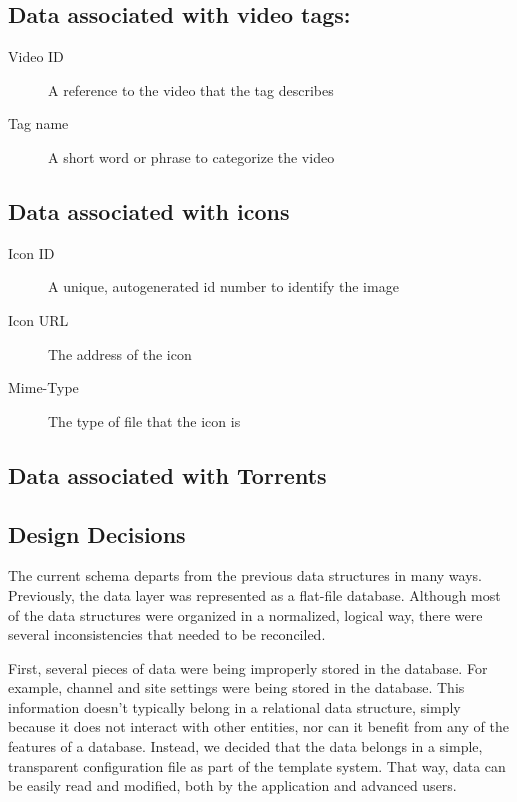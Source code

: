 \documentclass[a4paper,12pt]{report}
\begin{document}
\subsection{Data associated with video tags:}
\begin{description}
\item[Video ID] A reference to the video that the tag describes
\item[Tag name] A short word or phrase to categorize the video
\end{description}

\subsection{Data associated with icons}
\begin{description}
\item[Icon ID] A unique, autogenerated id number to identify the image
\item[Icon URL] The address of the icon
\item[Mime-Type] The type of file that the icon is
\end{description}

\subsection{Data associated with Torrents}



\subsection{Design Decisions}
The current schema departs from the previous data structures in many ways.
Previously, the data layer was represented as a flat-file database.
Although most of the data structures were organized in a normalized, logical way, there were several inconsistencies that needed to be reconciled.


First, several pieces of data were being improperly stored in the database. 
For example, channel and site settings were being stored in the database. 
This information doesn't typically belong in a relational data structure, simply because it does not interact with other entities, nor can it benefit from any of the features of a database. 
Instead, we decided that the data belongs in a simple, transparent configuration file as part of the template system. 
That way, data can be easily read and modified, both by the application and advanced users. 
\end{document}
